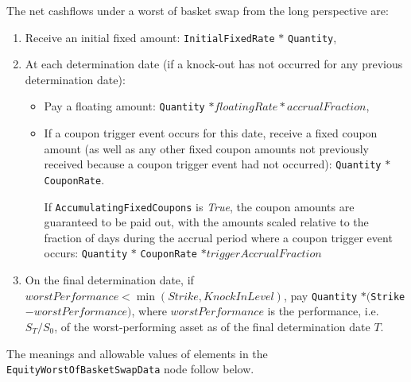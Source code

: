 The net cashflows under a worst of basket swap from the long perspective are:
\begin{enumerate}
  \item Receive an initial fixed amount: \lstinline!InitialFixedRate! $*$ \lstinline!Quantity!,
  \item At each determination date (if a knock-out has not occurred for any previous determination date): \begin{itemize}
      \item Pay a floating amount: \lstinline!Quantity! $* floatingRate * accrualFraction$,
      \item If a coupon trigger event occurs for this date, receive a fixed coupon amount (as well as any other fixed coupon amounts not previously received because a coupon trigger event had not occurred): \lstinline!Quantity! $*$ \lstinline!CouponRate!.

      If \lstinline!AccumulatingFixedCoupons! is \emph{True}, the coupon amounts are guaranteed to be paid out,
      with the amounts scaled relative to the fraction of days during the accrual period where a coupon trigger event occurs:
      \lstinline!Quantity! $*$ \lstinline!CouponRate! $* triggerAccrualFraction$
    \end{itemize}
  \item On the final determination date, if $worstPerformance < \min(Strike, KnockInLevel)$, pay \lstinline!Quantity! $* ($\lstinline!Strike!$ - worstPerformance)$, where $worstPerformance$ is the performance, i.e.\ $S_T/S_0$, of the worst-performing asset as of the final determination date $T$.
\end{enumerate}

The meanings and allowable values of elements in the \lstinline!EquityWorstOfBasketSwapData! node follow below.

